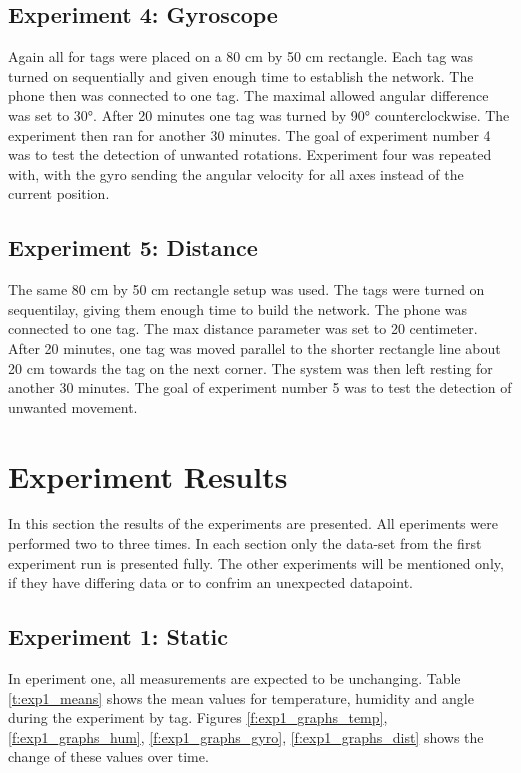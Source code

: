 \subsection{Experiment 4: Gyroscope}
\label{ss:exp_4_1}
Again all for tags were placed on a 80 cm by 50 cm rectangle.
Each tag was turned on sequentially and given enough time to establish the network.
The phone then was connected to one tag.
The maximal allowed angular difference was set to 30°.
After 20 minutes one tag was turned by 90° counterclockwise.
The experiment then ran for another 30 minutes.
The goal of experiment number 4 was to test the detection of unwanted rotations.
Experiment four was repeated with, with the gyro sending the angular velocity for all axes instead of the current position.


\subsection{Experiment 5: Distance}
\label{ss:exp_5}
The same 80 cm by 50 cm rectangle setup was used.
The tags were turned on sequentilay, giving them enough time to build the network.
The phone was connected to one tag.
The max distance parameter was set to 20 centimeter.
After 20 minutes, one tag was moved parallel to the shorter rectangle line about 20 cm towards the tag on the next corner.
The system was then left resting for another 30 minutes.
The goal of experiment number 5 was to test the detection of unwanted movement.

\section{Experiment Results}
\label{s:exp_res}

In this section the results of the experiments are presented.
All eperiments were performed two to three times.
In each section only the data-set from the first experiment run is presented fully.
The other experiments will be mentioned only, if they have differing data or to confrim an unexpected datapoint.

\subsection{Experiment 1: Static}
\label{ss:exp_1_result}
In eperiment one, all measurements are expected to be unchanging.
Table \ref{t:exp1_means} shows the mean values for temperature, humidity and angle during the experiment by tag.
Figures \ref{f:exp1_graphs_temp}, \ref{f:exp1_graphs_hum}, \ref{f:exp1_graphs_gyro}, \ref{f:exp1_graphs_dist} shows the change of these values over time.

